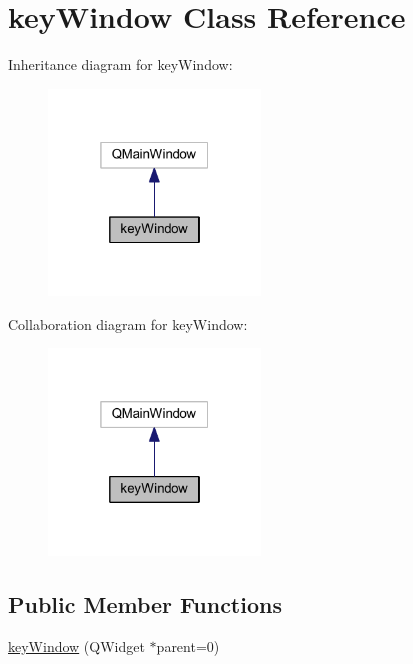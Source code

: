 \hypertarget{classkey_window}{}\section{key\+Window Class Reference}
\label{classkey_window}


Inheritance diagram for key\+Window\+:\nopagebreak
\begin{figure}[H]
\begin{center}
\leavevmode
\includegraphics[width=160pt]{classkey_window__inherit__graph}
\end{center}
\end{figure}


Collaboration diagram for key\+Window\+:\nopagebreak
\begin{figure}[H]
\begin{center}
\leavevmode
\includegraphics[width=160pt]{classkey_window__coll__graph}
\end{center}
\end{figure}
\subsection*{Public Member Functions}
\begin{DoxyCompactItemize}
\item 
\hyperlink{classkey_window_a79110b19771e23a36eb3f08820bae125}{key\+Window} (Q\+Widget $\ast$parent=0)
\end{DoxyCompactItemize}


